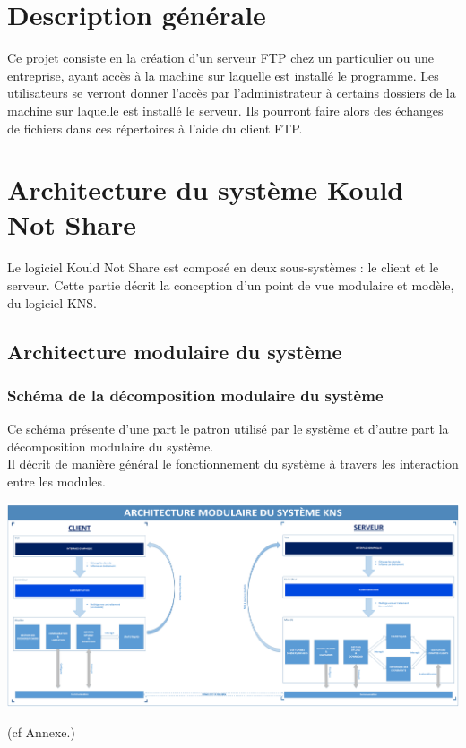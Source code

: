 \documentclass[10pt,a4paper]{report}
\begin{document}
\section{Description générale}

Ce projet consiste en la création d'un serveur FTP chez un particulier ou une entreprise, ayant accès à la machine sur laquelle est installé le programme. Les utilisateurs se verront donner l'accès par l'administrateur à certains dossiers de la machine sur laquelle est installé le serveur. Ils pourront faire alors des échanges de fichiers dans ces répertoires à l'aide du client FTP.\\

\section{Architecture du système Kould Not Share}

		Le logiciel Kould Not Share est composé en deux sous-systèmes : le client et le serveur. Cette partie décrit la conception d'un point de vue modulaire et modèle, du logiciel KNS.

	\subsection{Architecture modulaire du système}

		\subsubsection{Schéma de la décomposition modulaire du système}
			\begin{flushleft}
			Ce schéma présente d'une part le patron utilisé par le système et d'autre part la décomposition modulaire du système.\\
			Il décrit de manière général le fonctionnement du système à travers les interaction entre les modules.
			\end{flushleft}
			\begin{center}
				\includegraphics[scale=0.23]{Ressources/modules_KNS.png}
			\end{center}
		(cf Annexe.)
\end{document}
